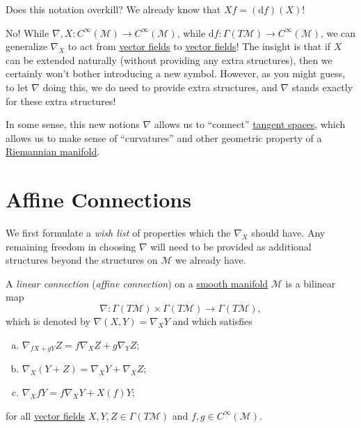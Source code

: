 \begin{problem*}
	Does this notation overkill? We already know that \(Xf = (\mathrm{d} f)(X)\)!
\end{problem*}
\begin{answer}
	No! While \(\nabla , X\colon C^{\infty} (\mathcal{M} ) \to C^{\infty} (\mathcal{M} )\), while \(\mathrm{d} f\colon \Gamma (T \mathcal{M} ) \to C^{\infty} (\mathcal{M} )\), we can generalize \(\nabla _X\) to act from \hyperref[def:vector-field]{vector fields} to \hyperref[def:vector-field]{vector fields}! The insight is that if \(X\) can be extended naturally (without providing any extra structures), then we certainly won't bother introducing a new symbol. However, as you might guess, to let \(\nabla \) doing this, we do need to provide extra structures, and \(\nabla \) stands exactly for these extra structures!
\end{answer}

In some sense, this new notions \(\nabla \) allows us to ``connect'' \hyperref[def:tangent-space]{tangent spaces}, which allows us to make sense of ``curvatures'' and other geometric property of a \hyperref[def:Riemannian-manifold]{Riemannian manifold}.

\section{Affine Connections}
We first formulate a \emph{wish list} of properties which the \(\nabla _X\) should have. Any remaining freedom in choosing \(\nabla \) will need to be provided as additional structures beyond the structures on \(\mathcal{M}\) we already have.

\begin{definition}\label{def:linear-connection}
	A \emph{linear connection} (\emph{affine connection}) on a \hyperref[def:smooth-manifold]{smooth manifold} \(\mathcal{M}\) is a bilinear map
	\[
		\nabla \colon \Gamma (T \mathcal{M} ) \times \Gamma (T \mathcal{M} ) \to \Gamma (T \mathcal{M} ),
	\]
	which is denoted by \(\nabla (X, Y) = \nabla _X Y\) and which satisfies
	\begin{enumerate}[(a)]
		\item \(\nabla _{fX+gY}Z = f \nabla _X Z + g \nabla _Y Z\);
		\item \(\nabla _X (Y+Z) = \nabla _X Y + \nabla _X Z\);
		      \item\label{def:linear-connection-c} \(\nabla _X fY = f \nabla _X Y + X(f)Y\);
	\end{enumerate}
	for all \hyperref[def:vector-field]{vector fields} \(X, Y, Z\in \Gamma (T \mathcal{M} )\) and \(f, g\in C^{\infty} (\mathcal{M} )\).
\end{definition}

